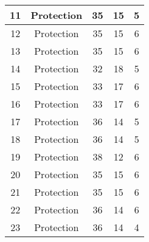 \documentclass[results.tex]{subfiles}
\begin{document}
\begin{center}
\begin{tabular}{| c || c | c | c | c |}
            \hline
            11                      & Protection                   & 35                     & 15                      & 5                    \\
            \hline
            12                      & Protection                   & 35                     & 15                      & 6                    \\
            \hline
            13                      & Protection                   & 35                     & 15                      & 6                    \\
            \hline
            14                      & Protection                   & 32                     & 18                      & 5                    \\
            \hline
            15                      & Protection                   & 33                     & 17                      & 6                    \\
            \hline
            16                      & Protection                   & 33                     & 17                      & 6                    \\
            \hline
            17                      & Protection                   & 36                     & 14                      & 5                    \\
            \hline
            18                      & Protection                   & 36                     & 14                      & 5                    \\
            \hline
            19                      & Protection                   & 38                     & 12                      & 6                    \\
            \hline
            20                      & Protection                   & 35                     & 15                      & 6                    \\
            \hline
            21                      & Protection                   & 35                     & 15                      & 6                    \\
            \hline
            22                      & Protection                   & 36                     & 14                      & 6                    \\
            \hline
            23                      & Protection                   & 36                     & 14                      & 4                    \\

\end{tabular}
\end{center}
\end{document}
